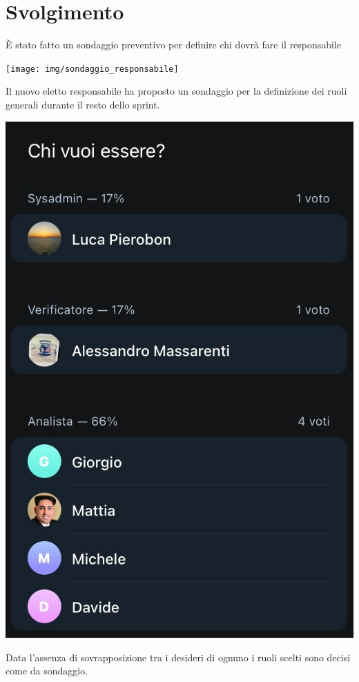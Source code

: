 \section{Svolgimento}

È stato fatto un sondaggio preventivo per definire chi dovrà fare il responsabile
\begin{center}
\texttt{[image: img/sondaggio\_responsabile]}
\end{center}

Il nuovo eletto responsabile ha proposto un sondaggio per la definizione dei ruoli generali durante il resto dello sprint.

\begin{center}
    \includegraphics[width = 0.4\linewidth]{img/ruoli}
\end{center}

Data l'assenza di sovrapposizione tra i desideri di ognuno i ruoli scelti sono decisi come da sondaggio.